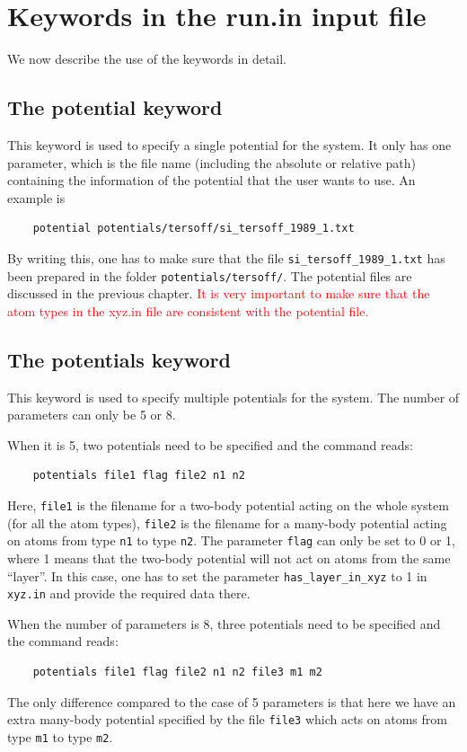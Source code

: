 \documentclass[12pt,a4paper]{report}
\begin{document}
\section{Keywords in the run.in input file}
We now describe the use of the keywords in detail.

\subsection{The potential keyword}

This keyword is used to specify a single potential for the system. It only has one parameter, which is the file name (including the absolute or relative path) containing the information of the potential that the user wants to use. An example is
\begin{verbatim}
    potential potentials/tersoff/si_tersoff_1989_1.txt
\end{verbatim}
By writing this, one has to make sure that the file \verb"si_tersoff_1989_1.txt" has been prepared in the folder \verb"potentials/tersoff/".
The potential files are discussed in the previous chapter. \textcolor{red}{It is very important to make sure that the atom types in the xyz.in file are consistent with the potential file.}

\subsection{The potentials keyword}

This keyword is used to specify multiple potentials for the system. The number of parameters can only be 5 or 8. 

When it is 5, two potentials need to be specified and the command reads:
\begin{verbatim}
    potentials file1 flag file2 n1 n2
\end{verbatim}
Here, \verb"file1" is the filename for a two-body potential acting on the whole system (for all the atom types), \verb"file2" is the filename for a many-body potential acting on atoms from type \verb"n1" to type \verb"n2". The parameter \verb"flag" can only be set to 0 or 1, where 1 means that the two-body potential will not act on atoms from the same ``layer''. In this case, one has to set the parameter \verb"has_layer_in_xyz" to 1 in \verb"xyz.in" and provide the required data there.

When the number of parameters is 8, three potentials need to be specified and the command reads:
\begin{verbatim}
    potentials file1 flag file2 n1 n2 file3 m1 m2
\end{verbatim}
The only difference compared to the case of 5 parameters is that here we have an extra many-body potential specified by the file \verb"file3" which acts on atoms from type \verb"m1" to type \verb"m2".
\end{document}
